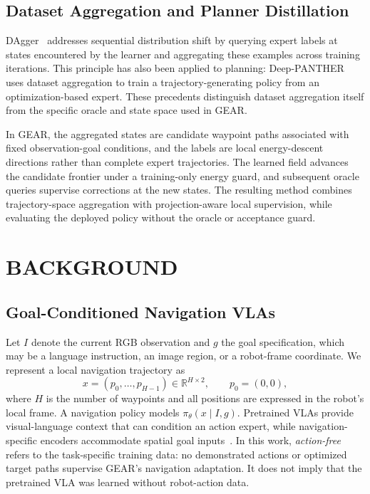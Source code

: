 \documentclass[letterpaper, 10 pt, conference]{ieeeconf}  %
\begin{document}
\subsection{Dataset Aggregation and Planner Distillation}

DAgger~\cite{dagger} addresses sequential distribution shift by querying
expert labels at states encountered by the learner and aggregating these
examples across training iterations. This principle has also been applied
to planning: Deep-PANTHER~\cite{deeppanther} uses dataset aggregation to
train a trajectory-generating policy from an optimization-based expert.
These precedents distinguish dataset aggregation itself from the specific
oracle and state space used in GEAR.

In GEAR, the aggregated states are candidate waypoint paths associated
with fixed observation-goal conditions, and the labels are local
energy-descent directions rather than complete expert trajectories. The
learned field advances the candidate frontier under a training-only
energy guard, and subsequent oracle queries supervise corrections at the
new states. The resulting method combines trajectory-space aggregation
with projection-aware local supervision, while evaluating the deployed
policy without the oracle or acceptance guard.


\section{BACKGROUND}
\label{sec:background}

\subsection{Goal-Conditioned Navigation VLAs}
\label{sec:bg_vla}

Let $I$ denote the current RGB observation and $g$ the goal
specification, which may be a language instruction, an image region,
or a robot-frame coordinate. We represent a local navigation
trajectory as
\begin{equation}
    x = (p_0,\ldots,p_{H-1}) \in \mathbb{R}^{H\times 2},
    \qquad p_0 = (0,0),
\end{equation}
where $H$ is the number of waypoints and all positions are expressed
in the robot's local frame. A navigation policy models
$\pi_\theta(x\mid I,g)$. Pretrained VLAs provide visual-language
context that can condition an action expert, while
navigation-specific encoders accommodate spatial goal
inputs~\cite{pi05,omnivla}. In this work, \emph{action-free}
refers to the task-specific training data: no demonstrated actions
or optimized target paths supervise GEAR's navigation adaptation.
It does not imply that the pretrained VLA was learned without
robot-action data.
\end{document}
